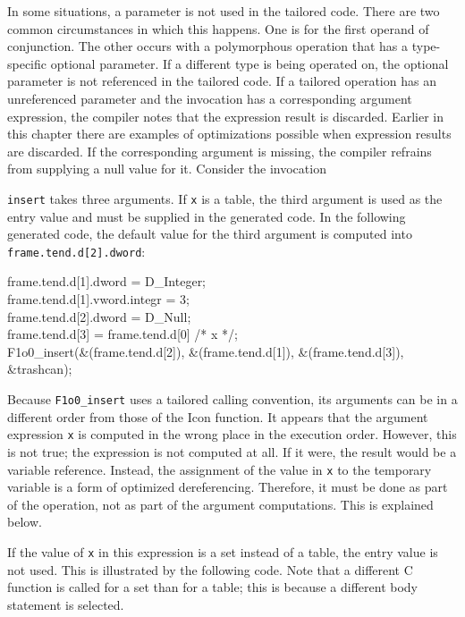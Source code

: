 In some situations, a parameter is not used in the tailored
code. There are two common circumstances in which this happens. One is
for the first operand of conjunction. The other occurs with a
polymorphous operation that has a type-specific optional parameter. If
a different type is being operated on, the optional parameter is not
referenced in the tailored code. If a tailored operation has an
unreferenced parameter and the invocation has a corresponding argument
expression, the compiler notes that the expression result is
discarded. Earlier in this chapter there are examples of optimizations
possible when expression results are discarded. If the corresponding
argument is missing, the compiler refrains from supplying a null value
for it. Consider the invocation


\noindent \texttt{insert} takes three arguments. If \texttt{x} is a
table, the third argument is used as the entry value and must be
supplied in the generated code. In the following generated code, the
default value for the third argument is computed into
\texttt{frame.tend.d[2].dword}:

\goodbreak
\begin{iconcode}
\>frame.tend.d[1].dword = D\_Integer;\\
\>frame.tend.d[1].vword.integr = 3;\\
\>frame.tend.d[2].dword = D\_Null;\\
\>frame.tend.d[3] = frame.tend.d[0] /* x */;\\
\>F1o0\_insert(\&(frame.tend.d[2]), \&(frame.tend.d[1]), \&(frame.tend.d[3]),\\
\>\>\&trashcan);\\
\end{iconcode}

\noindent
Because \texttt{F1o0\_insert} uses a tailored calling convention, its arguments
can be in a different order from those of the Icon function. It
appears that the argument expression \texttt{x} is computed in the wrong place
in the execution order.  However, this is not true; the expression is
not computed at all. If it were, the result would be a variable
reference.  Instead, the assignment of the value in \texttt{x} to the temporary
variable is a form of optimized dereferencing. Therefore, it must be
done as part of the operation, not as part of the argument
computations. This is explained below.

If the value of \texttt{x} in this expression is a set instead of a table, the
entry value is not used. This is illustrated by the following
code. Note that a different C function is called for a set than for a
table; this is because a different body statement is selected.

